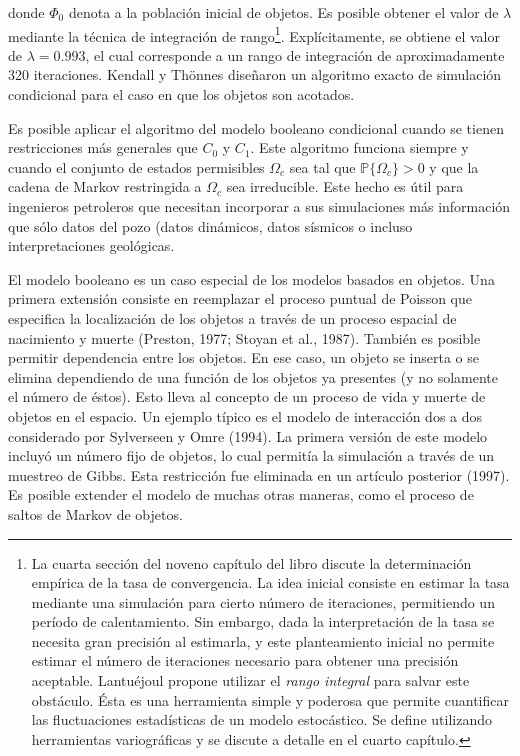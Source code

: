 donde $\Phi_0$ denota a la poblaci\'on inicial de objetos. Es posible obtener el valor de $\lambda$ mediante la t\'ecnica de integraci\'on de rango\footnote{La cuarta secci\'on del noveno cap\'itulo del libro discute la determinaci\'on emp\'irica de la tasa de convergencia. La idea inicial consiste en estimar la tasa mediante una simulaci\'on para cierto n\'umero de iteraciones, permitiendo un per\'iodo de calentamiento. Sin embargo, dada la interpretaci\'on de la tasa se necesita gran precisi\'on al estimarla, y este planteamiento inicial no permite estimar el n\'umero de iteraciones necesario para obtener una precisi\'on aceptable. Lantu\'ejoul propone utilizar el \textit{rango integral} para salvar este obst\'aculo. \'Esta es una herramienta simple y poderosa que permite cuantificar las fluctuaciones estad\'isticas de un modelo estoc\'astico. Se define utilizando herramientas variogr\'aficas y se discute a detalle en el cuarto cap\'itulo.}. Expl\'icitamente, se obtiene el valor de $\lambda=0.993$, el cual corresponde a un rango de integraci\'on de aproximadamente 320 iteraciones. Kendall y Th\"onnes dise\~naron un algoritmo exacto de simulaci\'on condicional para el caso en que los objetos son acotados.

Es posible aplicar el algoritmo del modelo booleano condicional cuando se tienen restricciones m\'as generales que $C_0$ y $C_1$. Este algoritmo funciona siempre y cuando el conjunto de estados permisibles $\Omega_c$ sea tal que $\mathbb{P}\{\Omega_c\}>0$ y que la cadena de Markov restringida a $\Omega_c$ sea irreducible. Este hecho es \'util para ingenieros petroleros que necesitan incorporar a sus simulaciones m\'as informaci\'on que s\'olo datos del pozo (datos din\'amicos, datos s\'ismicos o incluso interpretaciones geol\'ogicas.

El modelo booleano es un caso especial de los modelos basados en objetos. Una primera extensi\'on consiste en reemplazar el proceso puntual de Poisson que especifica la localizaci\'on de los objetos a trav\'es de un proceso espacial de nacimiento y muerte (Preston, 1977; Stoyan et al., 1987). Tambi\'en es posible permitir dependencia entre los objetos. En ese caso, un objeto se inserta o se elimina dependiendo de una funci\'on de los objetos ya presentes (y no solamente el n\'umero de \'estos). Esto lleva al concepto de un proceso de vida y muerte de objetos en el espacio. Un ejemplo t\'ipico es el modelo de interacci\'on dos a dos considerado por Sylverseen y Omre (1994). La primera versi\'on de este modelo incluy\'o un n\'umero fijo de objetos, lo cual permit\'ia la simulaci\'on a trav\'es de un muestreo de Gibbs. Esta restricci\'on fue eliminada en un art\'iculo posterior (1997). Es posible extender el modelo de muchas otras maneras, como el proceso de saltos de Markov de objetos.


